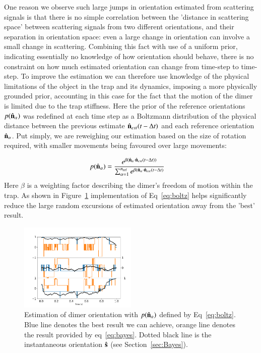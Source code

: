\documentclass[preprint,  3p]{elsarticle}
\begin{document}
One reason we observe such large jumps in orientation estimated from scattering signals is that there is no simple correlation between the 'distance in scattering space' between scattering signals from two different orientations, and their separation in orientation space: even a large change in orientation can involve a small change in scattering. Combining this fact with use of a uniform prior, indicating essentially no knowledge of how orientation should behave, there is no constraint on how much estimated orientation can change from time-step to time-step. To improve the estimation we can therefore use knowledge of the physical limitations of the object in the trap and its dynamics, imposing a more physically grounded prior, accounting in this case for the fact that the motion of the dimer is limited due to the trap stiffness. Here the prior of the reference orientations $p(\hat{\bf n}_\alpha)$ was redefined at each time step as a Boltzmann distribution of the physical distance between the previous estimate $\hat{\bf n}_{est}(t-\Delta t)$ and each reference orientation $\hat{\bf n}_\alpha$. Put simply, we are reweighing our estimation based on the size of rotation required, with smaller movements being favoured over large movements:

\begin{align}
  p(\hat{\bf n}_\alpha)
  &=\frac{e^{\beta (\hat{\bf n}_\alpha 
  	\cdot \hat{\bf n}_{est}(t-\Delta t))}}
  {\sum_{\alpha=1}^{n_{\rm ref}}
	e^{\beta (\hat{\bf n}_\alpha 
	\cdot \hat{\bf n}_{est}(t-\Delta t)}}
	\label{eq:boltz}
\end{align}
Here $\beta$ is a weighting factor describing the dimer's freedom of motion within the trap. As shown in Figure~\ref{fig:biased} implementation of Eq~\eqref{eq:boltz} helps significantly reduce the large random excursions of estimated orientation away from the 'best' result. 

\begin{figure}[h]
\centering
\includegraphics[width=0.5\textwidth]{./Images/fig8a.png}
\caption{\label{fig:biased}
%
Estimation of dimer orientation with $p(\hat{\bf n}_\alpha)$ defined
by Eq~\eqref{eq:boltz}.  Blue line denotes the best result we can
achieve, orange line denotes the result provided by eq~\ref{eq:bayes}.
Dotted black line is the instantaneous orientation $\hat{\bf s}$ (see Section~\ref{sec:Bayes}).
}
\end{figure} 
\end{document}
